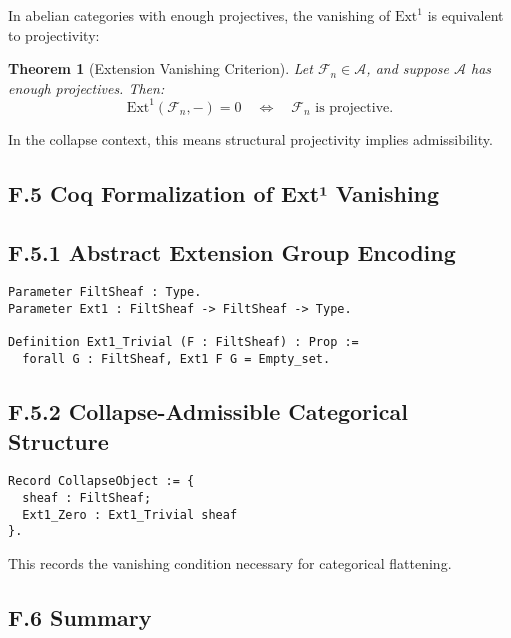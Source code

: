 \documentclass[11pt]{article}
\newtheorem{theorem}{Theorem}[section]
\begin{document}
In abelian categories with enough projectives, the vanishing of \( \mathrm{Ext}^1 \) is equivalent to projectivity:

\begin{theorem}[Extension Vanishing Criterion]
Let \( \mathcal{F}_n \in \mathcal{A} \), and suppose \( \mathcal{A} \) has enough projectives. Then:
\[
\mathrm{Ext}^1(\mathcal{F}_n, -) = 0 \quad \Leftrightarrow \quad \mathcal{F}_n \text{ is projective}.
\]
\end{theorem}

In the collapse context, this means structural projectivity implies admissibility.

\subsection*{F.5 Coq Formalization of Ext¹ Vanishing}

\subsection*{F.5.1 Abstract Extension Group Encoding}

\begin{lstlisting}[language=Coq]
Parameter FiltSheaf : Type.
Parameter Ext1 : FiltSheaf -> FiltSheaf -> Type.

Definition Ext1_Trivial (F : FiltSheaf) : Prop :=
  forall G : FiltSheaf, Ext1 F G = Empty_set.
\end{lstlisting}

\subsection*{F.5.2 Collapse-Admissible Categorical Structure}

\begin{lstlisting}[language=Coq]
Record CollapseObject := {
  sheaf : FiltSheaf;
  Ext1_Zero : Ext1_Trivial sheaf
}.
\end{lstlisting}

This records the vanishing condition necessary for categorical flattening.

\subsection*{F.6 Summary}
\end{document}
